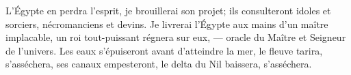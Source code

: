 L’Égypte en perdra l’esprit, je brouillerai son projet;
	ils consulteront idoles et sorciers, nécromanciens et devins.
Je livrerai l’Égypte aux mains d’un maître implacable,
	un roi tout-puissant régnera sur eux,
	--- oracle du Maître et Seigneur de l’univers.
Les eaux s’épuiseront avant d’atteindre la mer,
	le fleuve tarira, s’asséchera, ses canaux empesteront,
	le delta du Nil baissera, s’asséchera.
